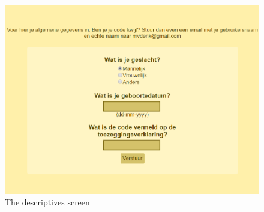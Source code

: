 \begin{figure}
    \centering
    \includegraphics[width=.8\textwidth]{img/ui_descriptives.png}
    \caption{The descriptives screen}
    \label{fig:ui_descriptives}
\end{figure}

